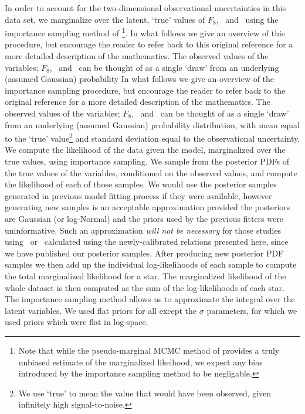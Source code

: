 In order to account for the two-dimensional observational uncertainties in
this data set, we marginalize over the latent, `true' values of $F_8$,
\rhostar\ and \logg\ using the importance sampling method of
\citep{hogg:2010}\footnote{Note that while the pseudo-marginal MCMC method of
\citep{andrieu:2009} provides a truly unbiased estimate of the marginalized
likelhood, we expect any bias introduced by the importance sampling method to
be negligable.}.
In what follows we give an overview of this procedure, but encourage the
reader to refer back  to this original reference for a more detailed
description of the mathematics.
The observed values of the variables; $F_8$, \rhostar\ and \logg\ can be
thought of as a single `draw' from an underlying (assumed Gaussian)
probability
In what follows we give an overview of the importance sampling procedure, but
encourage the reader to refer back to the original reference for a more
detailed description of the mathematics.
The observed values of the variables; $F_8$, \rhostar\ and \logg\ can be
thought of as a single `draw' from an underlying (assumed Gaussian) probability
distribution, with mean equal to the `true' value\footnote{We use `true' to
mean the value that would have been observed, given infinitely high
signal-to-noise.} and standard deviation equal to the observational
uncertainty.
We compute the likelihood of the data given the model, marginalized over the
true values, using importance sampling.
We sample from the posterior PDFs of the true values of the variables,
conditioned on the observed values, and compute the likelihood of each of those
samples.
We would use the posterior samples generated in previous model fitting process
if they were available, however generating new samples is an acceptable
approximation provided the posteriors are Gaussian (or log-Normal) and the
priors used by the previous fitters were uninformative.
Such an approximation {\it will not be necessary} for those studies using
\rhostar\ or \logg\ calculated using the newly-calibrated relations
presented here, since we have published our posterior samples.
After producing new posterior PDF samples we then add up the individual
log-likelihoods of each sample to compute the total marginalized likelihood
for a star.
The marginalized likelihood of the whole dataset is then computed as the sum
of the log-likelihoods of each star.
The importance sampling method allows us to approximate the integral over the
latent variables.
We used flat priors for all except the $\sigma$ parameters, for which we used
priors which were flat in log-space.

